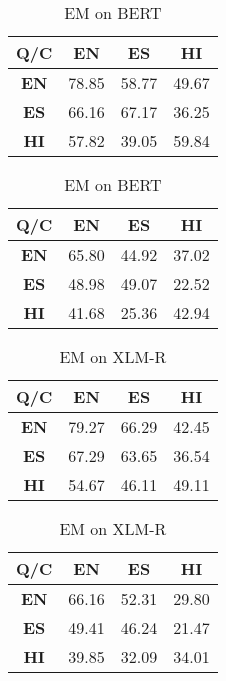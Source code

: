 \documentclass[12pt]{article}   %
\begin{document}
 \begin{table}[H]
        \begin{minipage}{0.5\textwidth}
            \centering
		\begin{tabular}{|c|c|c|c|}
			\hline
 			\textbf{Q/C} &  \textbf{EN} &  \textbf{ES} &  \textbf{HI} \\
			\hline
			 \textbf{EN} & 78.85 &58.77 & 49.67 \\
			\hline
			\textbf{ES} & 66.16 & 67.17 & 36.25 \\
			\hline
			\textbf{HI} & 57.82 & 39.05 & 59.84 \\
			\hline
		\end{tabular}
		\caption{F1 on BERT}
	\end{minipage}%
        \hfill
	\begin{minipage}{0.5\textwidth}
         	\centering
			\begin{tabular}{|c|c|c|c|}
				\hline
				 \textbf{Q/C} &  \textbf{EN} &  \textbf{ES} &  \textbf{HI} \\
				 \hline
				\textbf{EN} & 65.80& 44.92 & 37.02 \\
				 \hline
				\textbf{ES} & 48.98 & 49.07 & 22.52 \\
				\hline
				 \textbf{HI} & 41.68& 25.36 & 42.94\\
				 \hline
			\end{tabular}
			\caption{EM on BERT}
	\end{minipage}%
\end{table}

 \begin{table}[H]
        \begin{minipage}{0.5\textwidth}
            \centering
		\begin{tabular}{|c|c|c|c|}
			\hline
 			\textbf{Q/C} &  \textbf{EN} &  \textbf{ES} &  \textbf{HI} \\
			\hline
			 \textbf{EN} & 79.27 & 66.29 & 42.45 \\
			\hline
			\textbf{ES} & 67.29 & 63.65 & 36.54 \\
			\hline
			\textbf{HI} & 54.67 & 46.11 & 49.11 \\
			\hline
		\end{tabular}
		\caption{F1 on XLM-R}
	\end{minipage}%
        \hfill
	\begin{minipage}{0.5\textwidth}
         	\centering
			\begin{tabular}{|c|c|c|c|}
				\hline
				 \textbf{Q/C} &  \textbf{EN} &  \textbf{ES} &  \textbf{HI} \\
				\hline
				\textbf{EN} & 66.16& 52.31 & 29.80 \\
				 \hline
				\textbf{ES} & 49.41 & 46.24 & 21.47 \\
				\hline
				 \textbf{HI} & 39.85& 32.09 & 34.01\\
				 \hline
			\end{tabular}
			\caption{EM on XLM-R}
	\end{minipage}%
\end{table}
\end{document}
